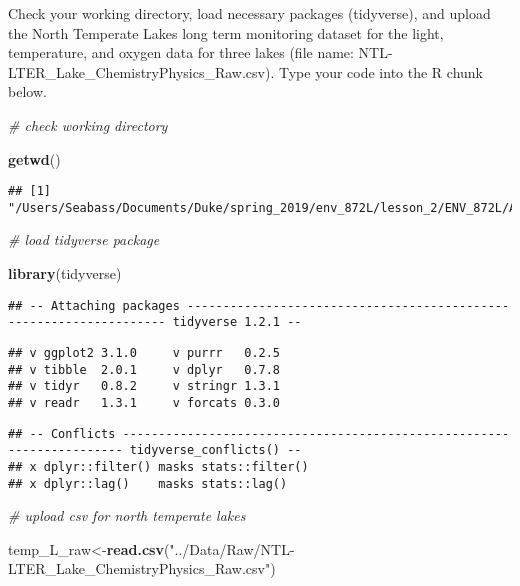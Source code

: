 \documentclass[]{article}
\newenvironment{Shaded}{\begin{snugshade}}{\end{snugshade}}
\newcommand{\KeywordTok}[1]{\textcolor[rgb]{0.13,0.29,0.53}{\textbf{#1}}}
\newcommand{\StringTok}[1]{\textcolor[rgb]{0.31,0.60,0.02}{#1}}
\newcommand{\CommentTok}[1]{\textcolor[rgb]{0.56,0.35,0.01}{\textit{#1}}}
\newcommand{\NormalTok}[1]{#1}
\begin{document}
Check your working directory, load necessary packages (tidyverse), and
upload the North Temperate Lakes long term monitoring dataset for the
light, temperature, and oxygen data for three lakes (file name:
NTL-LTER\_Lake\_ChemistryPhysics\_Raw.csv). Type your code into the R
chunk below.

\begin{Shaded}
\begin{Highlighting}[]
\CommentTok{# check working directory }

\KeywordTok{getwd}\NormalTok{()}
\end{Highlighting}
\end{Shaded}

\begin{verbatim}
## [1] "/Users/Seabass/Documents/Duke/spring_2019/env_872L/lesson_2/ENV_872L/Assignments"
\end{verbatim}

\begin{Shaded}
\begin{Highlighting}[]
\CommentTok{# load tidyverse package}

\KeywordTok{library}\NormalTok{(tidyverse)}
\end{Highlighting}
\end{Shaded}

\begin{verbatim}
## -- Attaching packages ------------------------------------------------------------------- tidyverse 1.2.1 --
\end{verbatim}

\begin{verbatim}
## v ggplot2 3.1.0     v purrr   0.2.5
## v tibble  2.0.1     v dplyr   0.7.8
## v tidyr   0.8.2     v stringr 1.3.1
## v readr   1.3.1     v forcats 0.3.0
\end{verbatim}

\begin{verbatim}
## -- Conflicts ---------------------------------------------------------------------- tidyverse_conflicts() --
## x dplyr::filter() masks stats::filter()
## x dplyr::lag()    masks stats::lag()
\end{verbatim}

\begin{Shaded}
\begin{Highlighting}[]
\CommentTok{# upload csv for north temperate lakes }

\NormalTok{temp_L_raw<-}\KeywordTok{read.csv}\NormalTok{(}\StringTok{"../Data/Raw/NTL-LTER_Lake_ChemistryPhysics_Raw.csv"}\NormalTok{)}
\end{Highlighting}
\end{Shaded}
\end{document}
